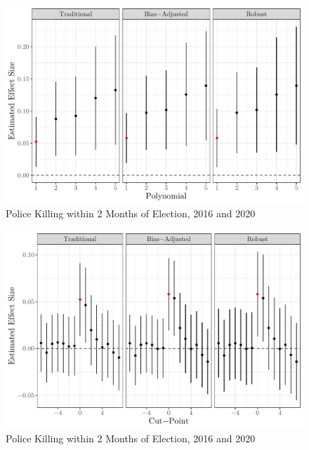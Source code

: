 \documentclass[
  12pt,
]{article}
\begin{document}
\begin{figure}[h]

{\centering \includegraphics{shoot_to_files/figure-latex/diff-poly-1} 

}

\caption{\label{fig:map}Police Killing within 2 Months of Election, 2016 and 2020}\label{fig:diff-poly}
\end{figure}

\begin{figure}[h]

{\centering \includegraphics{shoot_to_files/figure-latex/placebo-cuts-1} 

}

\caption{\label{fig:map}Police Killing within 2 Months of Election, 2016 and 2020}\label{fig:placebo-cuts}
\end{figure}
\end{document}
